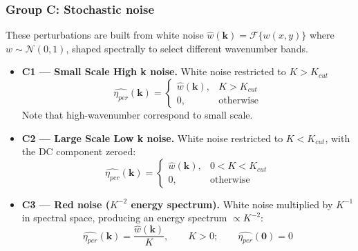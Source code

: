 \documentclass[../SQG_notes.tex]{subfiles}
\begin{document}
    \subsubsection{Group C: Stochastic noise}
    These perturbations are built from white noise $\hat{w}(\mathbf{k}) = \mathcal{F}\{w(x,y)\}$ where $w \sim \mathcal{N}(0,1)$, shaped spectrally to select different wavenumber bands.
    \begin{itemize}
        \item \textbf{C1 --- Small Scale High k noise.} White noise restricted to $K > K_{cut}$
        \[ \hat{\eta_{per}}(\mathbf{k}) = \begin{cases} \hat{w}(\mathbf{k}), & K > K_{cut} \\ 0, & \text{otherwise} \end{cases} \]
        Note that high-wavenumber correspond to small scale.

        \item \textbf{C2 --- Large Scale Low k noise.} White noise restricted to $K < K_{cut}$, with the DC component zeroed:
        \[ \hat{\eta_{per}}(\mathbf{k}) = \begin{cases} \hat{w}(\mathbf{k}), & 0 < K < K_{cut} \\ 0, & \text{otherwise} \end{cases} \]

        \item \textbf{C3 --- Red noise ($K^{-2}$ energy spectrum).} White noise multiplied by $K^{-1}$ in spectral space, producing an energy spectrum $\propto K^{-2}$:
        \[ \hat{\eta_{per}}(\mathbf{k}) = \frac{\hat{w}(\mathbf{k})}{K}, \qquad K > 0; \qquad \hat{\eta_{per}}(\mathbf{0}) = 0 \]
    \end{itemize}
\end{document}
